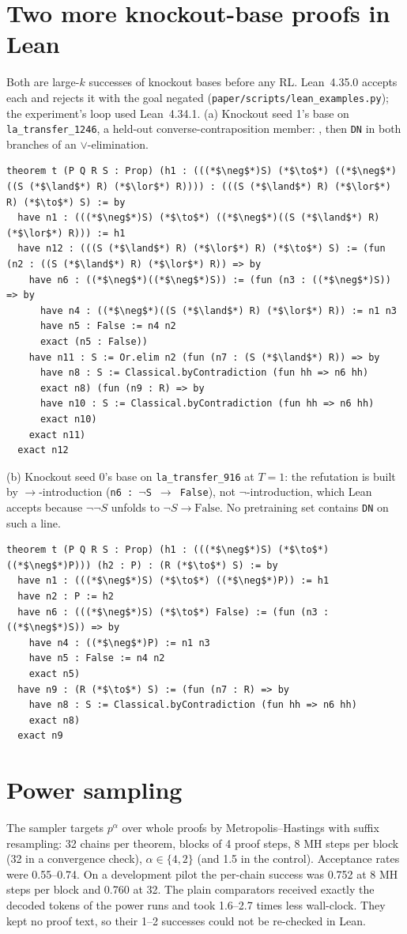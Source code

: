 \section{Two more knockout-base proofs in Lean}
\label{app:lean}
Both are large-$k$ successes of knockout bases before any RL. Lean~4.35.0 accepts each and rejects it with the goal
negated (\texttt{paper/scripts/lean\_examples.py}); the experiment's loop used Lean~4.34.1. (a) Knockout seed 1's base on \texttt{la\_transfer\_1246}, a held-out
converse-contraposition member: \sig{}, then \texttt{DN} in both branches of an $\lor$-elimination.
\begin{lstlisting}
theorem t (P Q R S : Prop) (h1 : (((*$\neg$*)S) (*$\to$*) ((*$\neg$*)((S (*$\land$*) R) (*$\lor$*) R)))) : (((S (*$\land$*) R) (*$\lor$*) R) (*$\to$*) S) := by
  have n1 : (((*$\neg$*)S) (*$\to$*) ((*$\neg$*)((S (*$\land$*) R) (*$\lor$*) R))) := h1
  have n12 : (((S (*$\land$*) R) (*$\lor$*) R) (*$\to$*) S) := (fun (n2 : ((S (*$\land$*) R) (*$\lor$*) R)) => by
    have n6 : ((*$\neg$*)((*$\neg$*)S)) := (fun (n3 : ((*$\neg$*)S)) => by
      have n4 : ((*$\neg$*)((S (*$\land$*) R) (*$\lor$*) R)) := n1 n3
      have n5 : False := n4 n2
      exact (n5 : False))
    have n11 : S := Or.elim n2 (fun (n7 : (S (*$\land$*) R)) => by
      have n8 : S := Classical.byContradiction (fun hh => n6 hh)
      exact n8) (fun (n9 : R) => by
      have n10 : S := Classical.byContradiction (fun hh => n6 hh)
      exact n10)
    exact n11)
  exact n12
\end{lstlisting}
(b) Knockout seed 0's base on \texttt{la\_transfer\_916} at $T=1$: the refutation is built by $\to$-introduction
(\texttt{n6 : $\neg$S $\to$ False}), not $\neg$-introduction, which Lean accepts because $\neg\neg S$ unfolds to
$\neg S \to \mathrm{False}$. No pretraining set contains \texttt{DN} on such a line.
\begin{lstlisting}
theorem t (P Q R S : Prop) (h1 : (((*$\neg$*)S) (*$\to$*) ((*$\neg$*)P))) (h2 : P) : (R (*$\to$*) S) := by
  have n1 : (((*$\neg$*)S) (*$\to$*) ((*$\neg$*)P)) := h1
  have n2 : P := h2
  have n6 : (((*$\neg$*)S) (*$\to$*) False) := (fun (n3 : ((*$\neg$*)S)) => by
    have n4 : ((*$\neg$*)P) := n1 n3
    have n5 : False := n4 n2
    exact n5)
  have n9 : (R (*$\to$*) S) := (fun (n7 : R) => by
    have n8 : S := Classical.byContradiction (fun hh => n6 hh)
    exact n8)
  exact n9
\end{lstlisting}

\section{Power sampling}
\label{app:power}
The sampler targets $p^\alpha$ over whole proofs by Metropolis--Hastings with suffix resampling: 32 chains per theorem,
blocks of 4 proof steps, 8 MH steps per block (32 in a convergence check), $\alpha \in \{4, 2\}$ (and 1.5 in the
control). Acceptance rates were 0.55--0.74. On a development pilot the per-chain success was 0.752 at 8 MH steps per
block and 0.760 at 32. The plain comparators received exactly the decoded tokens of the power runs and took 1.6--2.7
times less wall-clock. They kept no proof text, so their 1--2 successes could not be re-checked in Lean.


